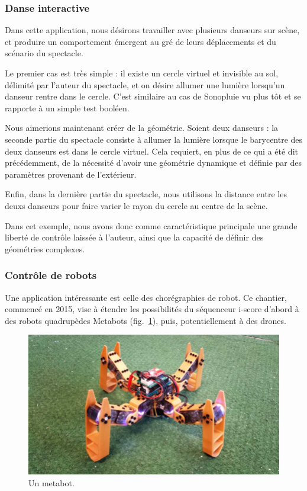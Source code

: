 \documentclass[french,12pt]{article}
\begin{document}
\subsubsection{Danse interactive}
Dans cette application, nous désirons travailler avec plusieurs danseurs sur scène, et produire un comportement émergent au gré de leurs déplacements et du scénario du spectacle.

Le premier cas est très simple : il existe un cercle virtuel et invisible au sol, délimité par l'auteur du spectacle, et on désire allumer une lumière lorsqu'un danseur rentre dans le cercle. C'est similaire au cas de Sonopluie vu plus tôt et se rapporte à un simple test booléen.

Nous aimerions maintenant créer de la géométrie. Soient deux danseurs : la seconde partie du spectacle consiste à allumer la lumière lorsque le barycentre des deux danseurs est dans le cercle virtuel. Cela requiert, en plus  de ce qui a été dit précédemment, de la nécessité d'avoir une géométrie dynamique et définie par des paramètres provenant de l'extérieur.

Enfin, dans la dernière partie du spectacle, nous utilisons la distance entre les deuxs danseurs pour faire varier le rayon du cercle au centre de la scène.

Dans cet exemple, nous avons donc comme caractéristique principale une grande liberté de contrôle laissée à l'auteur, ainsi que la capacité de définir des géométries complexes.

\subsubsection{Contrôle de robots}
Une application intéressante est celle des chorégraphies de robot. Ce chantier, commencé en 2015, vise à étendre les possibilités du séquenceur i-score d'abord à des robots quadrupèdes Metabots (fig.~\ref{fig.metabots}), puis, potentiellement à des drones.

\begin{figure}[h]
\centering
\includegraphics[scale=0.2]{images/spidey.jpg}
\caption{Un metabot.}
\label{fig.metabots}
\end{figure} %
\end{document}
